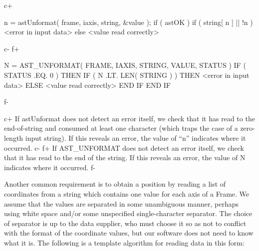 \documentclass[twoside,11pt]{starlink}
\begin{document}
c+
\small
\begin{terminalv}
n = astUnformat( frame, iaxis, string, &value );
if ( astOK ) {
   if ( string[ n ] || !n ) {
      <error in input data>
   } else {
      <value read correctly>
   }
}
\end{terminalv}
\normalsize
c-
f+
\small
\begin{terminalv}
      N = AST_UNFORMAT( FRAME, IAXIS, STRING, VALUE, STATUS )
      IF ( STATUS .EQ. 0 ) THEN
         IF ( N .LT. LEN( STRING ) ) THEN
            <error in input data>
         ELSE
            <value read correctly>
         END IF
      END IF
\end{terminalv}
\normalsize
f-

c+
If astUnformat does not detect an error itself, we check that it has
read to the end-of-string and consumed at least one character (which
traps the case of a zero-length input string). If this reveals an
error, the value of ``n'' indicates where it occurred.
c-
f+
If AST\_UNFORMAT does not detect an error itself, we check that it has
read to the end of the string. If this reveals an error, the value of
N indicates where it occurred.
f-

Another common requirement is to obtain a position by reading a list
of coordinates from a string which contains one value for each axis of
a Frame. We assume that the values are separated in some unambiguous
manner, perhaps using white space and/or some unspecified
single-character separator. The choice of separator is up to the data
supplier, who must choose it so as not to conflict with the format of
the coordinate values, but our software does not need to know what it
is. The following is a template algorithm for reading data in this
form:
\end{document}
